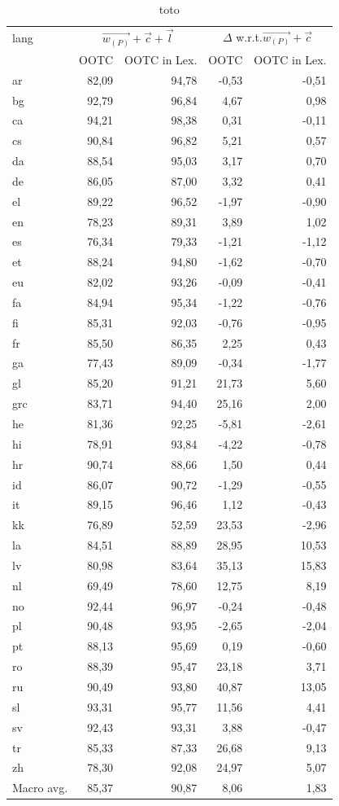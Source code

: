 \documentclass[11pt,a4paper]{article}
\begin{document}
\begin{table}[th]
\centering\scriptsize
\begin{tabular}{lrrrr}
\toprule
lang & \multicolumn{2}{c}{$\vec{w_{(P)}}+\vec{c}+\vec{l}$}& \multicolumn{2}{c}{$\Delta$ w.r.t.$\vec{w_{(P)}}+\vec{c}$}\\[1mm]
 & OOTC & OOTC in Lex. & OOTC & OOTC in Lex.\\
\midrule
ar & 82,09 & 94,78 & -0,53 & -0,51\\
bg & 92,79 & 96,84 & 4,67 & 0,98\\
ca & 94,21 & 98,38 & 0,31 & -0,11\\
cs & 90,84 & 96,82 & 5,21 & 0,57\\
da & 88,54 & 95,03 & 3,17 & 0,70\\
de & 86,05 & 87,00 & 3,32 & 0,41\\
el & 89,22 & 96,52 & -1,97 & -0,90\\
en & 78,23 & 89,31 & 3,89 & 1,02\\
es & 76,34 & 79,33 & -1,21 & -1,12\\
et & 88,24 & 94,80 & -1,62 & -0,70\\
eu & 82,02 & 93,26 & -0,09 & -0,41\\
fa & 84,94 & 95,34 & -1,22 & -0,76\\
fi & 85,31 & 92,03 & -0,76 & -0,95\\
fr & 85,50 & 86,35 & 2,25 & 0,43\\
ga & 77,43 & 89,09 & -0,34 & -1,77\\
gl & 85,20 & 91,21 & 21,73 & 5,60\\
grc & 83,71 & 94,40 & 25,16 & 2,00\\
he & 81,36 & 92,25 & -5,81 & -2,61\\
hi & 78,91 & 93,84 & -4,22 & -0,78\\
hr & 90,74 & 88,66 & 1,50 & 0,44\\
id & 86,07 & 90,72 & -1,29 & -0,55\\
it & 89,15 & 96,46 & 1,12 & -0,43\\
kk & 76,89 & 52,59 & 23,53 & -2,96\\
la & 84,51 & 88,89 & 28,95 & 10,53\\
lv & 80,98 & 83,64 & 35,13 & 15,83\\
nl & 69,49 & 78,60 & 12,75 & 8,19\\
no & 92,44 & 96,97 & -0,24 & -0,48\\
pl & 90,48 & 93,95 & -2,65 & -2,04\\
pt & 88,13 & 95,69 & 0,19 & -0,60\\
ro & 88,39 & 95,47 & 23,18 & 3,71\\
ru & 90,49 & 93,80 & 40,87 & 13,05\\
sl & 93,31 & 95,77 & 11,56 & 4,41\\
sv & 92,43 & 93,31 & 3,88 & -0,47\\
tr & 85,33 & 87,33 & 26,68 & 9,13\\
zh & 78,30 & 92,08 & 24,97 & 5,07\\
\midrule
Macro avg. & 85,37 & 90,87 & 8,06 & 1,83\\
\bottomrule
\end{tabular}
\caption{toto}
\end{table}
\end{document}
